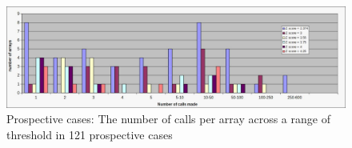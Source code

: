 \begin{table}[]
\centering
\caption[Prospective cases: The prevalence of calls]{Prospective Cases: The proportion of the 121 arrays where a call has been made, and the total number of calls made across a range of thresholds. At a threshold of 3.55 12\% of arrays contain a call. Across these 14 cases there are 246 calls, of which 119 is made in a single case.}
\label{tab:prospectivecasecalls}
\end{table}

\begin{figure}
\centering
\includegraphics[width=1\linewidth]{./Figures/prospectivesamplecalls}
\caption{Prospective cases: The number of calls per array across a range of threshold in 121 prospective cases}
\label{fig:prospectivesamplecalls}
\end{figure}

